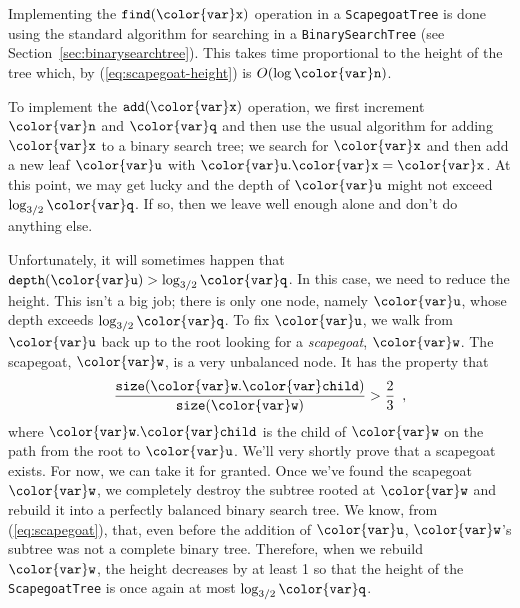\documentclass[10pt]{book}
\newcommand{\secref}[1]{Section~\ref{sec:#1}}
\newcommand{\eqlabel}[1]{\label{eq:#1}}
\newcommand{\myeqref}[1]{(\ref{eq:#1})}
\theoremstyle{plain}
\theoremstyle{definition}
\begin{document}
Implementing the \ensuremath{\mathtt{find({\color{var}x})}} operation in a \texttt{ScapegoatTree} is done
using the standard algorithm for searching in a \texttt{BinarySearchTree}
(see \secref{binarysearchtree}).  This takes time proportional to the
height of the tree which, by \myeqref{scapegoat-height} is $O(\log \ensuremath{\mathtt{{\color{var}n}}})$.

To implement the \ensuremath{\mathtt{add({\color{var}x})}} operation, we first increment \ensuremath{\mathtt{{\color{var}n}}} and \ensuremath{\mathtt{{\color{var}q}}}
and then use the usual algorithm for adding \ensuremath{\mathtt{{\color{var}x}}} to a binary search
tree; we search for \ensuremath{\mathtt{{\color{var}x}}} and then add a new leaf \ensuremath{\mathtt{{\color{var}u}}} with $\ensuremath{\mathtt{{\color{var}u}.{\color{var}x}}}=\ensuremath{\mathtt{{\color{var}x}}}$.
At this point, we may get lucky and the depth of \ensuremath{\mathtt{{\color{var}u}}} might not exceed
$\log_{3/2}\ensuremath{\mathtt{{\color{var}q}}}$. If so, then we leave well enough alone and don't do
anything else.

Unfortunately, it will sometimes happen that $\ensuremath{\mathtt{depth({\color{var}u})}} > \log_{3/2}
\ensuremath{\mathtt{{\color{var}q}}}$.  In this case, we need to reduce the height.  This isn't a big
job; there is only one node, namely \ensuremath{\mathtt{{\color{var}u}}}, whose depth exceeds $\log_{3/2}
\ensuremath{\mathtt{{\color{var}q}}}$.  To fix \ensuremath{\mathtt{{\color{var}u}}}, we walk from \ensuremath{\mathtt{{\color{var}u}}} back up to the root looking for a
\emph{scapegoat}, \ensuremath{\mathtt{{\color{var}w}}}.  The scapegoat, \ensuremath{\mathtt{{\color{var}w}}}, is a very unbalanced node.
It has the property that
\begin{equation}
   \frac{\ensuremath{\mathtt{size({\color{var}w}.{\color{var}child})}}}{\ensuremath{\mathtt{size({\color{var}w})}}} > \frac{2}{3} \enspace ,
   \eqlabel{scapegoat}
\end{equation}
where \ensuremath{\mathtt{{\color{var}w}.{\color{var}child}}} is the child of \ensuremath{\mathtt{{\color{var}w}}} on the path from the root to \ensuremath{\mathtt{{\color{var}u}}}.
We'll very shortly prove that a scapegoat exists.  For now, we can
take it for granted.  Once we've found the scapegoat \ensuremath{\mathtt{{\color{var}w}}}, we completely
destroy the subtree rooted at \ensuremath{\mathtt{{\color{var}w}}} and rebuild it into a perfectly balanced
binary search tree.  We know, from \myeqref{scapegoat}, that, even before
the addition of \ensuremath{\mathtt{{\color{var}u}}}, \ensuremath{\mathtt{{\color{var}w}}}'s subtree was not a complete binary tree.
Therefore, when we rebuild \ensuremath{\mathtt{{\color{var}w}}}, the height decreases by at least 1 so that the height of the \texttt{ScapegoatTree} is once again at most $\log_{3/2}\ensuremath{\mathtt{{\color{var}q}}}$.
\end{document}
